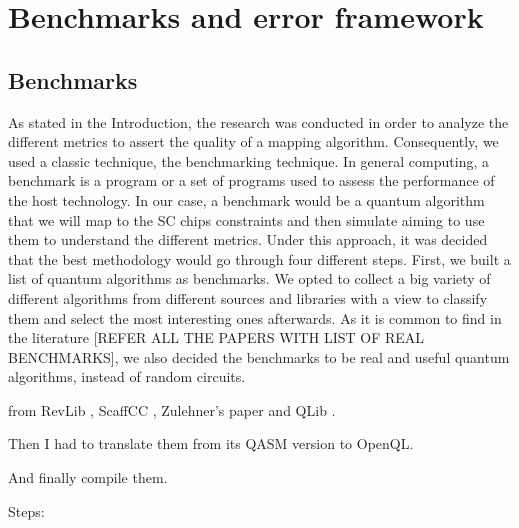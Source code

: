 
\chapter*{Benchmarks and error framework}
\label{sec:orgf9e2461}

\section*{Benchmarks}
\label{sec:orgaf6f1cc}

As stated in the Introduction, the research was conducted in order to analyze the different metrics to assert the quality of a mapping algorithm.
Consequently, we used a classic technique, the benchmarking technique.
In general computing, a benchmark is a program or a set of programs used to assess the performance of the host technology.
In our case, a benchmark would be a quantum algorithm that we will map to the SC chips constraints and then simulate aiming to use them to understand the different metrics.
Under this approach, it was decided that the best methodology would go through four different steps.
First, we built a list of quantum algorithms as benchmarks.
We opted to collect a big variety of different algorithms from different sources and libraries with a view to classify them and select the most interesting ones afterwards.
As it is common to find in the literature [REFER ALL THE PAPERS WITH LIST OF REAL BENCHMARKS], we also decided the benchmarks to be real and useful quantum algorithms, instead of random circuits.

from RevLib \cite{Wille_2008}, ScaffCC \cite{JavadiAbhari_2015}, Zulehner's paper \cite{zulehner17:effic_method_mappin_quant_circuit} and QLib \cite{Lin_2014}.


Then I had to translate them from its QASM version to OpenQL.

And finally compile them.


Steps:

